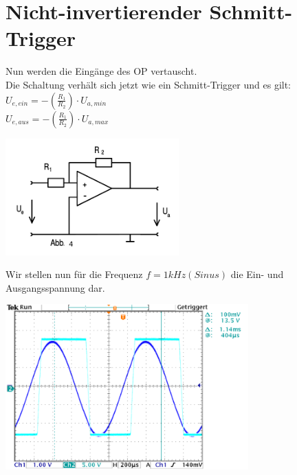\documentclass[11pt,a4paper,titlepage]{article}
\begin{document}
\newpage

\section{Nicht-invertierender Schmitt-Trigger}
Nun werden die Eing\"ange des OP vertauscht. \\[1ex]
Die Schaltung verh\"alt sich jetzt wie ein Schmitt-Trigger und es gilt: \\
$U_{e,ein}=-(\frac{R_1}{R_2}) \cdot U_{a,min}$ \\
$U_{e,aus}=-(\frac{R_1}{R_2}) \cdot U_{a,max}$ \\[1ex]
\begin{center}
\includegraphics[width=0.5\textwidth]{schalt-3}
\end{center}
Wir stellen nun f\"ur die Frequenz $f=1kHz (Sinus)$ die Ein- und Ausgangsspannung dar.
\begin{center}
\includegraphics[width=0.7\textwidth]{10}
\end{center}

\newpage
\end{document}
